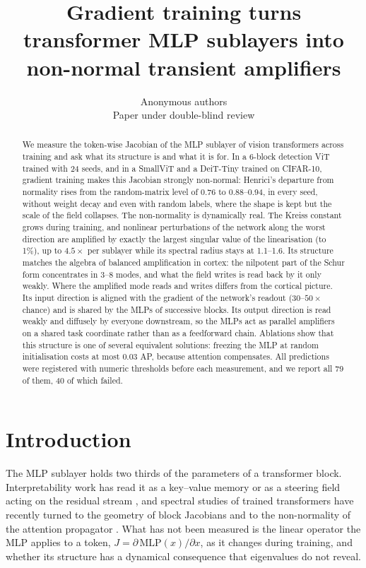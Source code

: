 \documentclass[10pt]{article}
\title{Gradient training turns transformer MLP sublayers into\\ non-normal transient amplifiers}
\author{Anonymous authors\\ Paper under double-blind review}
\begin{document}
\maketitle

\begin{abstract}
We measure the token-wise Jacobian of the MLP sublayer of vision transformers across training and ask what its structure is and what it
is for. In a 6-block detection ViT trained with 24 seeds, and in a SmallViT and a DeiT-Tiny trained on CIFAR-10, gradient training makes
this Jacobian strongly non-normal: Henrici's departure from normality rises from the random-matrix level of 0.76 to 0.88--0.94, in every
seed, without weight decay and even with random labels, where the shape is kept but the scale of the field collapses. The non-normality is
dynamically real. The Kreiss constant grows during training, and nonlinear perturbations of the network along the worst direction are
amplified by exactly the largest singular value of the linearisation (to 1\%), up to $4.5\times$ per sublayer while its spectral
radius stays at 1.1--1.6. Its structure matches the algebra of balanced amplification in cortex: the nilpotent part of the Schur form concentrates in 3--8
modes, and what the field writes is read back by it only weakly. Where the amplified mode reads and writes differs from the cortical
picture. Its input direction is aligned with the gradient of the network's readout ($30$--$50\times$ chance) and is shared by the MLPs of
successive blocks. Its output direction is read weakly and diffusely by everyone downstream, so the MLPs act as parallel amplifiers on a
shared task coordinate rather than as a feedforward chain. Ablations show that this structure is one of several equivalent solutions:
freezing the MLP at random initialisation costs at most 0.03 AP, because attention compensates. All predictions were registered with
numeric thresholds before each measurement, and we report all 79 of them, 40 of which failed.
\end{abstract}

\section{Introduction}

The MLP sublayer holds two thirds of the parameters of a transformer block. Interpretability work has read it as a key--value memory
\citep{geva2021transformer} or as a steering field acting on the residual stream \citep{mudarisov2026feedforward}, and spectral studies of
trained transformers have recently turned to the geometry of block Jacobians \citep{aubry2025transformer,fernando2026dynamics} and to
the non-normality of the attention propagator \citep{li2026transient}. What has not been measured is the linear operator the MLP
applies to a token, $J=\partial\,\mathrm{MLP}(x)/\partial x$, as it changes during training, and whether its structure has a dynamical
consequence that eigenvalues do not reveal.
\end{document}

